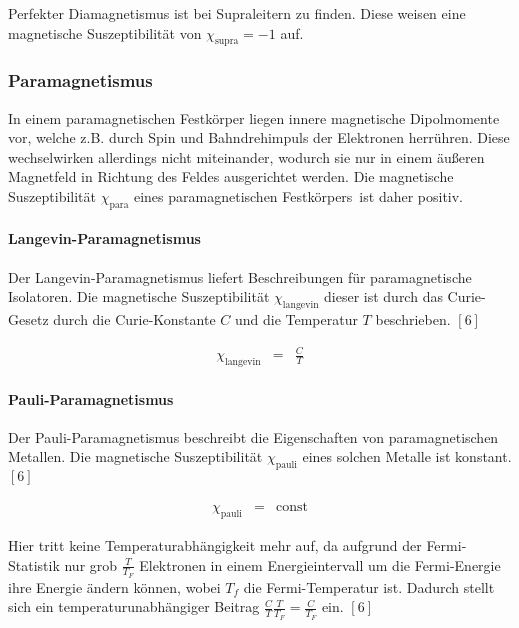 \documentclass[12pt,a4paper]{scrartcl}
\numberwithin{equation}{section} %
\renewcommand{\[}{} %
\renewcommand{\]}{\noindent} %
\begin{document}
Perfekter Diamagnetismus ist bei Supraleitern zu finden. Diese weisen
eine magnetische Suszeptibilität von \(\chi_\mathrm{supra} = -1\) auf.

\hypertarget{paramagnetismus}{%
\subsubsection{Paramagnetismus}\label{paramagnetismus}}

In einem paramagnetischen Festkörper liegen innere magnetische
Dipolmomente vor, welche z.B. durch Spin und Bahndrehimpuls der
Elektronen herrühren. Diese wechselwirken allerdings nicht miteinander,
wodurch sie nur in einem äußeren Magnetfeld in Richtung des Feldes
ausgerichtet werden. Die magnetische Suszeptibilität
\(\chi_\mathrm{para}\) eines paramagnetischen Festkörpers~ist daher
positiv.

\hypertarget{langevin-paramagnetismus}{%
\paragraph{Langevin-Paramagnetismus}\label{langevin-paramagnetismus}}

Der Langevin-Paramagnetismus liefert Beschreibungen für paramagnetische
Isolatoren. Die magnetische Suszeptibilität \(\chi_\mathrm{langevin}\)
dieser ist durch das Curie-Gesetz durch die Curie-Konstante \(C\) und
die Temperatur \(T\) beschrieben. \([6]\)

\[
\begin{eqnarray}
    \chi_\mathrm{langevin} &=& \frac{C}{T}
\end{eqnarray}
\]

\hypertarget{pauli-paramagnetismus}{%
\paragraph{Pauli-Paramagnetismus}\label{pauli-paramagnetismus}}

Der Pauli-Paramagnetismus beschreibt die Eigenschaften von
paramagnetischen Metallen. Die magnetische Suszeptibilität
\(\chi_\mathrm{pauli}\) eines solchen Metalle ist konstant. \([6]\)

\[
\begin{eqnarray}
    \chi_\mathrm{pauli} &=& \mathrm{const}
\end{eqnarray}
\]

Hier tritt keine Temperaturabhängigkeit mehr auf, da aufgrund der
Fermi-Statistik nur grob \(\frac{T}{T_F}\) Elektronen in einem
Energieintervall um die Fermi-Energie ihre Energie ändern können, wobei
\(T_{f}\) die Fermi-Temperatur ist. Dadurch stellt sich ein
temperaturunabhängiger Beitrag
\(\frac{C}{T} \frac{T}{T_F} = \frac{C}{T_F}\) ein. \([6]\)
\end{document}
